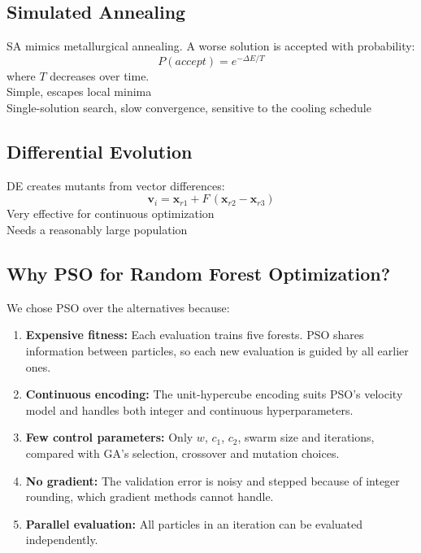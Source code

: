 \subsection{Simulated Annealing}
SA \cite{kirkpatrick1983} mimics metallurgical annealing. A worse solution is accepted with probability:
\begin{equation}
P(accept) = e^{-\Delta E / T}
\end{equation}
where $T$ decreases over time.\\
 Simple, escapes local minima\\
 Single-solution search, slow convergence, sensitive to the cooling schedule

\subsection{Differential Evolution}
DE \cite{storn1997} creates mutants from vector differences:
\begin{equation}
\mathbf{v}_i = \mathbf{x}_{r1} + F\,(\mathbf{x}_{r2} - \mathbf{x}_{r3})
\end{equation}
 Very effective for continuous optimization\\
 Needs a reasonably large population

\subsection{Why PSO for Random Forest Optimization?}
We chose PSO over the alternatives because:
\begin{enumerate}
\item \textbf{Expensive fitness:} Each evaluation trains five forests. PSO shares information between particles, so each new evaluation is guided by all earlier ones.
\item \textbf{Continuous encoding:} The unit-hypercube encoding suits PSO's velocity model and handles both integer and continuous hyperparameters.
\item \textbf{Few control parameters:} Only $w$, $c_1$, $c_2$, swarm size and iterations, compared with GA's selection, crossover and mutation choices.
\item \textbf{No gradient:} The validation error is noisy and stepped because of integer rounding, which gradient methods cannot handle.
\item \textbf{Parallel evaluation:} All particles in an iteration can be evaluated independently.
\end{enumerate}

